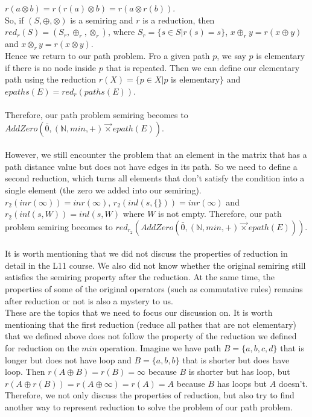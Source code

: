 \documentclass[a4paper,10pt]{article}
\begin{document}
$r(a\otimes b) = r(r(a)\otimes b) = r(a\otimes r(b))$.\\
So, if $(S,\oplus,\otimes)$ is a semiring and $r$ is a reduction, then $red_r(S) = (S_r,\oplus_r,\otimes_r)$, where $S_r = \{s\in S|r(s)= s\}$, $x\oplus_r y = r(x\oplus y)$ and $x\otimes_r y = r(x\otimes y)$.\\
Hence we return to our path problem. Fro a given path $p$, we say $p$ is elementary if there is no node inside $p$ that is repeated. Then we can define our elementary path using the reduction $r(X) = \{p\in X | p $ is elementary$\} $ and $epaths(E) = red_r(paths(E))$.\\\\
Therefore, our path problem semiring becomes to $AddZero(\bar0,(\mathbb{N},min,+) \overrightarrow{\times} epath(E))$.\\\\
However, we still encounter the problem that an element in the matrix that has a path distance value but does not have edges in its path. So we need to define a second reduction, which turns all elements that don't satisfy the condition into a single element (the zero we added into our semiring).\\
$r_2 (inr(\infty)) = inr(\infty)$, $r_2 (inl(s,\{\})) = inr(\infty)$ and $r_2 (inl(s,W)) = inl(s,W)$ where $W$ is not empty.
Therefore, our path problem semiring becomes to $red_{r_2}(AddZero(\bar0,(\mathbb{N},min,+) \overrightarrow{\times} epath(E)))$.\\\\
It is worth mentioning that we did not discuss the properties of reduction in detail in the L11 course. We also did not know whether the original semiring still satisfies the semiring property after the reduction. At the same time, the properties of some of the original operators (such as commutative rules) remains after reduction or not is also a mystery to us.\\
These are the topics that we need to focus our discussion on.
It is worth mentioning that the first reduction (reduce all pathes that are not elementary) that we defined above does not follow the property of the reduction we defined for reduction on the $min$ operation. Imagine we have path $B = \{a,b,c,d\}$ that is longer but does not have loop and $B = \{a,b,b\}$ that is shorter but does have loop. Then $r(A\oplus B) = r(B) = \infty$ because $B$ is shorter but has loop, but $r(A\oplus r(B)) = r(A \oplus \infty) = r(A) = A$ because $B$ has loops but $A$ doesn't.\\
Therefore, we not only discuss the properties of reduction, but also try to find another way to represent reduction to solve the problem of our path problem.
\end{document}
